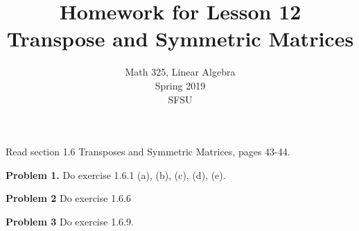 \documentclass[oneside,12pt]{amsart}
\begin{document}
\title{Homework for Lesson 12 \\ Transpose and Symmetric Matrices}
\author{Math 325, Linear Algebra \\ Spring 2019\\ SFSU }
\date{}

\maketitle

Read section 1.6 Transposes and Symmetric Matrices, pages 43-44.

\bigskip

\textbf{Problem 1.} Do exercise 1.6.1 (a), (b), (c), (d), (e).

\bigskip

\textbf{Problem 2} Do exercise 1.6.6

\bigskip

\textbf{Problem 3} Do exercise 1.6.9.
\end{document}

